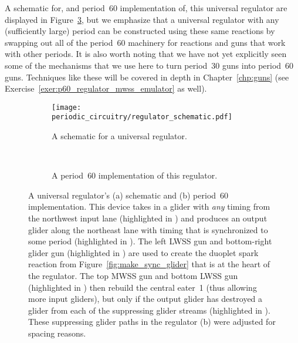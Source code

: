A schematic for, and period~$60$ implementation of, this universal regulator are displayed in Figure~\ref{fig:universal_regulator_periodic}, but we emphasize that a universal regulator with any (sufficiently large) period can be constructed using these same reactions by swapping out all of the period~$60$ machinery for reactions and guns that work with other periods. It is also worth noting that we have not yet explicitly seen some of the mechanisms that we use here to turn period~$30$ guns into period~$60$ guns. Techniques like these will be covered in depth in Chapter~\ref{chp:guns} (see Exercise~\ref{exer:p60_regulator_mwss_emulator} as well).

\begin{figure}[!htb]
	\centering
	\begin{subfigure}{.485\textwidth}
		\centering\hspace*{-0.42cm}
		\texttt{[image: periodic\_circuitry/regulator\_schematic.pdf]}
		\caption{A schematic for a universal regulator.}
		\label{fig:universal_regulator_schematic}
	\end{subfigure} \ \ \ %
	\begin{subfigure}{.485\textwidth}
		\centering\hspace*{-0.2cm}
		\caption{A period~$60$ implementation of this regulator.}
		\label{fig:universal_regulator_periodic_real}
	\end{subfigure}
	\caption{A universal regulator's (a) schematic and (b) period~$60$ implementation. This device takes in a glider with \emph{any} timing from the northwest input lane (highlighted in ) and produces an output glider along the northeast lane with timing that is synchronized to some period (highlighted in ). The left LWSS gun and bottom-right glider gun (highlighted in ) are used to create the duoplet spark reaction from Figure~\ref{fig:make_sync_glider} that is at the heart of the regulator. The top MWSS gun and bottom LWSS gun (highlighted in ) then rebuild the central eater~1 (thus allowing more input gliders), but only if the output glider has destroyed a glider from each of the suppressing glider streams (highlighted in ). These suppressing glider paths in the regulator (b) were adjusted for spacing reasons.}\label{fig:universal_regulator_periodic}
\end{figure}


